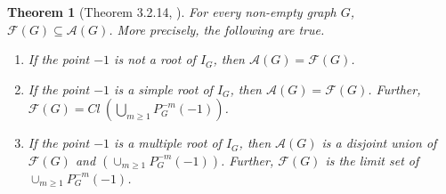 \documentclass[12pt,a4paper]{article}
\theoremstyle{plain}
\newtheorem{theorem}{Theorem}[section]
\numberwithin{equation}{section}
\begin{document}
\begin{theorem}[Theorem 3.2.14, \cite{hickman2001}]
For every non-empty graph \(G\), \(\mathcal{F}(G) \subseteq \mathcal{A}(G)\). More precisely, the following are true.
\begin{enumerate}
\item If the point $-1$ is not a root of $I_G$, then \(\mathcal{A}(G)=\mathcal{F}(G)\).
\item If the point $-1$ is a simple root of $I_G$, then $\mathcal{A}(G)=\mathcal{F}(G)$. Further, $ \mathcal{F}(G)= Cl~\left(\bigcup_{m\geq 1}P_G^{-m}(-1)\right)$.
\item If the point $-1$ is a multiple root of $I_G$, then $\mathcal{A}(G) $ is a disjoint union of $\mathcal{F}(G) $ and $ (\cup_{m\geq 1}P_G^{-m}(-1))  $. Further, $\mathcal{F}(G)$ is the limit set of $\cup_{m\geq 1}P_G^{-m}(-1)$.
\end{enumerate}
\label{Thm_attr1}
    \end{theorem}
\end{document}

